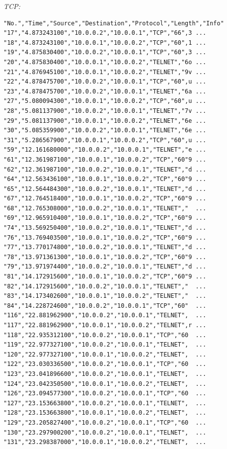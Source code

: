 \begin{enumerate}[resume=labsteps]
\begin{itemize}
\textit{TCP:}
\begin{verbatim}
"No.","Time","Source","Destination","Protocol","Length","Info"
"17","4.873243100","10.0.0.2","10.0.0.1","TCP","66",3 ...
"18","4.873243100","10.0.0.1","10.0.0.2","TCP","60",1 ...
"19","4.875830400","10.0.0.2","10.0.0.1","TCP","60",3 ...
"20","4.875830400","10.0.0.1","10.0.0.2","TELNET","6o ...
"21","4.876945100","10.0.0.1","10.0.0.2","TELNET","9v ...
"22","4.878475700","10.0.0.2","10.0.0.1","TCP","60",u ...
"23","4.878475700","10.0.0.2","10.0.0.1","TELNET","6a ...
"27","5.080094300","10.0.0.1","10.0.0.2","TCP","60",u ...
"28","5.081137900","10.0.0.2","10.0.0.1","TELNET","7v ...
"29","5.081137900","10.0.0.1","10.0.0.2","TELNET","6e ...
"30","5.085359900","10.0.0.2","10.0.0.1","TELNET","6e ...
"31","5.286567900","10.0.0.1","10.0.0.2","TCP","60",u ...
"59","12.161680000","10.0.0.2","10.0.0.1","TELNET","e ...
"61","12.361987100","10.0.0.1","10.0.0.2","TCP","60"9 ...
"62","12.361987100","10.0.0.2","10.0.0.1","TELNET","d ...
"64","12.563436100","10.0.0.1","10.0.0.2","TCP","60"9 ...
"65","12.564484300","10.0.0.2","10.0.0.1","TELNET","d ...
"67","12.764518400","10.0.0.1","10.0.0.2","TCP","60"9 ...
"68","12.765308000","10.0.0.2","10.0.0.1","TELNET","  ...
"69","12.965910400","10.0.0.1","10.0.0.2","TCP","60"9 ...
"74","13.569250400","10.0.0.2","10.0.0.1","TELNET","d ...
"76","13.769403500","10.0.0.1","10.0.0.2","TCP","60"9 ...
"77","13.770174800","10.0.0.2","10.0.0.1","TELNET","d ...
"78","13.971361300","10.0.0.1","10.0.0.2","TCP","60"9 ...
"79","13.971974400","10.0.0.2","10.0.0.1","TELNET","d ...
"81","14.172915600","10.0.0.1","10.0.0.2","TCP","60"9 ...
"82","14.172915600","10.0.0.2","10.0.0.1","TELNET","  ...
"83","14.173402600","10.0.0.1","10.0.0.2","TELNET","  ...
"84","14.228724600","10.0.0.2","10.0.0.1","TCP","60"  ...
"116","22.881962900","10.0.0.2","10.0.0.1","TELNET",  ...
"117","22.881962900","10.0.0.1","10.0.0.2","TELNET",r ...
"118","22.935312100","10.0.0.2","10.0.0.1","TCP","60  ...
"119","22.977327100","10.0.0.2","10.0.0.1","TELNET",  ...
"120","22.977327100","10.0.0.1","10.0.0.2","TELNET",  ...
"122","23.030336500","10.0.0.2","10.0.0.1","TCP","60  ...
"123","23.041896600","10.0.0.2","10.0.0.1","TELNET",  ...
"124","23.042350500","10.0.0.1","10.0.0.2","TELNET",  ...
"126","23.094577300","10.0.0.2","10.0.0.1","TCP","60  ...
"127","23.153663800","10.0.0.2","10.0.0.1","TELNET",  ...
"128","23.153663800","10.0.0.1","10.0.0.2","TELNET",  ...
"129","23.205827400","10.0.0.2","10.0.0.1","TCP","60  ...
"130","23.297900200","10.0.0.2","10.0.0.1","TELNET",  ...
"131","23.298387000","10.0.0.1","10.0.0.2","TELNET",  ...

\end{verbatim}
\end{itemize}
\end{enumerate}
